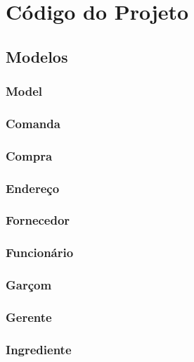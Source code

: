 \section{Código do Projeto}

\subsection{Modelos}

\subsubsection{Model}

\subsubsection{Comanda}

\subsubsection{Compra}

\subsubsection{Endereço}

\subsubsection{Fornecedor}

\subsubsection{Funcionário}

\subsubsection{Garçom}

\subsubsection{Gerente}

\subsubsection{Ingrediente}

